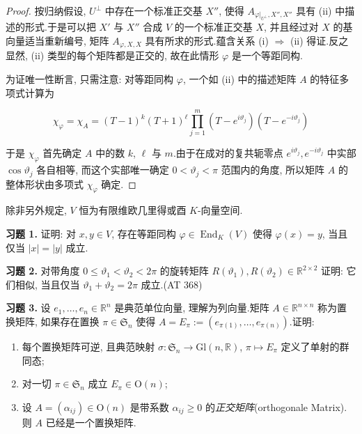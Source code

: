 \begin{proof}
按归纳假设, $U^{\perp}$ 中存在一个标准正交基 $X''$, 使得 $A_{\varphi|_{U^{\perp}}, X'', X''}$ 具有 (ii) 中描述的形式.于是可以把 $X'$ 与 $X''$ 合成 $V$ 的一个标准正交基 $X$, 并且经过对 $X$ 的基向量适当重新编号, 矩阵 $A_{\varphi, X, X}$ 具有所求的形式.蕴含关系 (i) $\Longrightarrow$ (ii) 得证.反之显然, (ii) 类型的每个矩阵都是正交的, 故在此情形 $\varphi$ 是一个等距同构.

为证唯一性断言, 只需注意: 对等距同构 $\varphi$, 一个如 (ii) 中的描述矩阵 $A$ 的特征多项式计算为

\[
\chi_\varphi = \chi_A = (T - 1)^k (T + 1)^\ell \prod_{j = 1}^{m} (T - e^{i\vartheta_j})(T - e^{-i\vartheta_j})
\]

于是 $\chi_\varphi$ 首先确定 $A$ 中的数 $k$, $\ell$ 与 $m$.由于在成对的复共轭零点 $e^{i\vartheta_j}, e^{-i\vartheta_j}$ 中实部 $\cos \vartheta_j$ 各自相等, 而这个实部唯一确定 $0 < \vartheta_j < \pi$ 范围内的角度, 所以矩阵 $A$ 的整体形状由多项式 $\chi_\varphi$ 确定.
\end{proof}

\aufgaben

除非另外规定, $V$ 恒为有限维欧几里得或酉 $K$-向量空间.

\medskip
\noindent\textbf{习题 1.} 证明: 对 $x, y \in V$, 存在等距同构 $\varphi \in \operatorname{End}_K(V)$ 使得 $\varphi(x) = y$, 当且仅当 $|x| = |y|$ 成立.

\medskip
\noindent\textbf{习题 2.} 对带角度 $0 \leq \vartheta_1 < \vartheta_2 < 2\pi$ 的旋转矩阵 $R(\vartheta_1), R(\vartheta_2) \in \mathbb{R}^{2 \times 2}$ 证明: 它们相似, 当且仅当 $\vartheta_1 + \vartheta_2 = 2\pi$ 成立.(AT 368)

\medskip
\noindent\textbf{习题 3.} 设 $e_1, \ldots, e_n \in \mathbb{R}^n$ 是典范单位向量, 理解为列向量.矩阵 $A \in \mathbb{R}^{n \times n}$ 称为置换矩阵, 如果存在置换 $\pi \in \mathfrak{S}_n$ 使得 $A = E_\pi := (e_{\pi(1)}, \ldots, e_{\pi(n)})$.证明:
\begin{enumerate}
\item[(i)] 每个置换矩阵可逆, 且典范映射 $\sigma \colon \mathfrak{S}_n \longrightarrow \mathrm{Gl}(n, \mathbb{R})$, $\pi \longmapsto E_\pi$ 定义了单射的群同态;
\item[(ii)] 对一切 $\pi \in \mathfrak{S}_n$ 成立 $E_\pi \in \mathrm{O}(n)$;
\item[(iii)] 设 $A = (\alpha_{ij}) \in \mathrm{O}(n)$ 是带系数 $\alpha_{ij} \geq 0$ 的\emph{正交矩阵}(\textup{orthogonale Matrix}).则 $A$ 已经是一个置换矩阵.
\end{enumerate}

